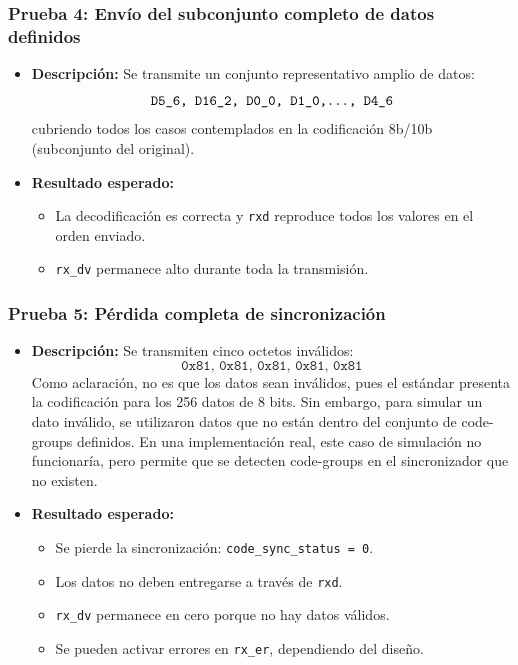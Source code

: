 \subsubsection*{Prueba 4: Envío del subconjunto completo de datos definidos}

\begin{itemize}
  \item \textbf{Descripción:}  
    Se transmite un conjunto representativo amplio de datos:
    \[
      \texttt{D5\_6,\ D16\_2,\ D0\_0,\ D1\_0,\dots,\ D4\_6}
    \]
    cubriendo todos los casos contemplados en la codificación 8b/10b (subconjunto del original).
  \item \textbf{Resultado esperado:}
    \begin{itemize}
      \item La decodificación es correcta y \texttt{rxd} reproduce todos los valores en el orden enviado.
      \item \texttt{rx\_dv} permanece alto durante toda la transmisión.
    \end{itemize}
\end{itemize}


\subsubsection*{Prueba 5: Pérdida completa de sincronización}

\begin{itemize}
  \item \textbf{Descripción:}  
    Se transmiten cinco octetos inválidos:
    \[
      \texttt{0x81,\ 0x81,\ 0x81,\ 0x81,\ 0x81}
    \]
    Como aclaración, no es que los datos sean inválidos, pues el estándar presenta la codificación para los 256 datos de 8 bits. Sin embargo, para simular un dato inválido, se utilizaron datos que no están dentro del conjunto de code-groups definidos.
    En una implementación real, este caso de simulación no funcionaría, pero permite que se detecten code-groups en el sincronizador que no existen.
  \item \textbf{Resultado esperado:}
    \begin{itemize}
      \item Se pierde la sincronización: \texttt{code\_sync\_status = 0}.
      \item Los datos no deben entregarse a través de \texttt{rxd}.
      \item \texttt{rx\_dv} permanece en cero porque no hay datos válidos.
      \item Se pueden activar errores en \texttt{rx\_er}, dependiendo del diseño.
    \end{itemize}
\end{itemize}


